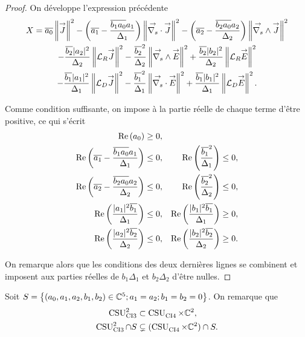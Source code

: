 \begin{proof}
    On développe l'expression précédente
    \begin{multline*}
      X = \conj{a_0} \norm{\vJ }^2 - \left(\conj{a_1} - \frac{\conj{b_1a_0}a_1}{\Delta_1}\right) \norm{\vdivs \vJ }^2 - \left(\conj{a_2} - \frac{\conj{b_2a_0}a_2}{\Delta_2}\right) \norm{\vrots \vJ }^2
      \\
      - \frac{\conj{b_2}|a_2|^2}{\Delta_2}\norm{\LR \vJ}^2  -  \frac{\conj{b_2}^2}{\Delta_2}\norm{\vrots\vE}^2 +  \frac{\conj{b_2}|b_2|^2}{\Delta_2} \norm{\LR \vE }^2
      \\
      - \frac{\conj{b_1}|a_1|^2}{\Delta_1}\norm{\LD \vJ}^2  - \frac{\conj{b_1}^2}{\Delta_1}\norm{\vdivs\vE}^2 + \frac{\conj{b_1}|b_1|^2}{\Delta_1} \norm{\LD \vE }^2.
    \end{multline*}

    Comme condition suffisante, on impose à la partie réelle de chaque terme d'être positive, ce qui s'écrit
    \begin{align*}
      \Re\left(a_0\right)\ge 0, && 
      \\
      \Re\left(\conj{a_1} - \frac{\conj{b_1a_0}a_1}{\Delta_1}\right) \le 0, && \Re\left(\frac{\conj{b_1}^2}{\Delta_1}\right) \le 0,
      \\
      \Re\left(\conj{a_2} - \frac{\conj{b_2a_0}a_2}{\Delta_2}\right) \le 0, && \Re\left(\frac{\conj{b_2}^2}{\Delta_2}\right) \le 0,
      \\
      \Re\left(\frac{|a_1|^2\conj{b_1}}{\Delta_1}\right) \le 0, && \Re\left(\frac{|b_1|^2\conj{b_1}}{\Delta_1}\right) \ge 0,
      \\
      \Re\left(\frac{|a_2|^2\conj{b_2}}{\Delta_2}\right) \le 0, && \Re\left(\frac{|b_2|^2\conj{b_2}}{\Delta_2}\right) \ge 0.
    \end{align*}


    On remarque alors que les conditions des deux dernières lignes se combinent et imposent aux parties réelles de \(b_1\Delta_1\) et \(b_2\Delta_2\) d'être nulles.
  \end{proof}

  Soit \(S = \left\lbrace (a_0,a_1,a_2,b_1,b_2) \in \CC^5 ; a_1 = a_2 ; b_1 = b_2 = 0 \right\rbrace \). On remarque que
  \begin{align}
    \CSU[2]{CI3} & \subset \CSU{CI4}\times\CC^2,
    \\
    \CSU[2]{CI3}\cap S & \subsetneq (\CSU{CI4}\times\CC^2)\cap S. 
  \end{align}

